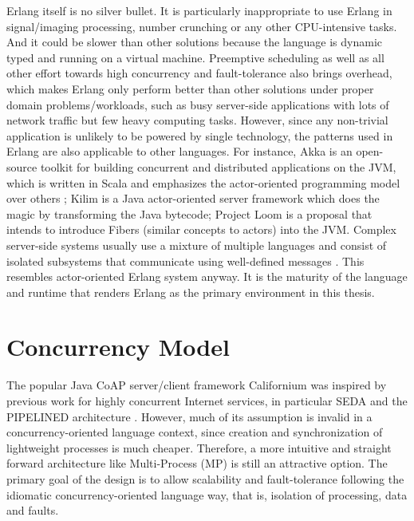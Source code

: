 Erlang itself is no silver bullet. It is particularly inappropriate to use Erlang in signal/imaging processing, number crunching or any other CPU-intensive tasks. And it could be slower than other solutions because the language is dynamic typed and running on a virtual machine. Preemptive scheduling as well as all other effort towards high concurrency and fault-tolerance also brings overhead, which makes Erlang only perform better than other solutions under proper domain problems/workloads, such as busy server-side applications with lots of network traffic but few heavy computing tasks. However, since any non-trivial application is unlikely to be powered by single technology, the patterns used in Erlang are also applicable to other languages. For instance, Akka \cite{akka} is an open-source toolkit for building concurrent and distributed applications on the JVM, which is written in Scala and emphasizes the actor-oriented programming model over others ; Kilim \cite{srinivasan2008kilim}\cite{UCAM-CL-TR-769} is a Java actor-oriented server framework which does the magic by transforming the Java bytecode; Project Loom \cite{java-loom} is a proposal that intends to introduce Fibers (similar concepts to actors) into the JVM. Complex server-side systems usually use a mixture of multiple languages and consist of isolated subsystems that communicate using well-defined messages \cite{UCAM-CL-TR-769}. This resembles actor-oriented Erlang system anyway. It is the maturity of the language and runtime that renders Erlang as the primary environment in this thesis.

\section{Concurrency Model}

The popular Java CoAP server/client framework Californium was inspired by previous work for highly concurrent Internet services, in particular SEDA and the PIPELINED architecture \cite{lanter2013scalability}\cite{kovatsch2015scalable}. However, much of its assumption is invalid in a concurrency-oriented language context, since creation and synchronization of lightweight processes is much cheaper. Therefore, a more intuitive and straight forward architecture like Multi-Process (MP) is still an attractive option. The primary goal of the design is to allow scalability and fault-tolerance following the idiomatic concurrency-oriented language way, that is, isolation of processing, data and faults. 

